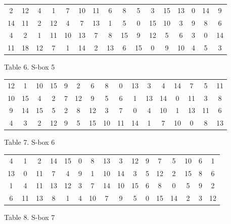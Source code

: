 \documentclass[11pt]{article}
\begin{document}
\begin{center}
\begin{tabular}{ | c | c | c | c | c | c | c | c | c | c | c | c | c | c | c | c |}
  \hline
    2&	12& 4& 1& 7& 10& 11& 6& 8& 5& 3& 15& 13& 0& 14& 9\\
    14&	11& 2& 12& 4& 7& 13& 1&	5& 0& 15& 10& 3& 9&	8& 6\\
    4&	2& 1& 11& 10& 13& 7& 8& 15& 9& 12& 5& 6& 3& 0& 14\\
    11&	18& 12& 7& 1& 14& 2& 13& 6& 15& 0& 9& 10& 4& 5& 3\\
  \hline
\end{tabular}
\end{center}
\begin{center}
Table 6. S-box 5
\end{center}

\begin{center}
\begin{tabular}{ | c | c | c | c | c | c | c | c | c | c | c | c | c | c | c | c |}
  \hline
    12&	1& 10& 15& 9& 2& 6&	8& 0& 13& 3& 4& 14&	7& 5& 11\\
    10&	15& 4& 2& 7& 12& 9& 5&	6& 1& 13& 14& 0& 11& 3& 8\\
    9&	14& 15& 5& 2& 8& 12& 3& 7& 0& 4& 10& 1& 13& 11& 6\\
    4&	3& 2& 12& 9& 5& 15& 10&	11& 14& 1& 7& 10& 0& 8& 13\\
  \hline
\end{tabular}
\end{center}
\begin{center}
Table 7. S-box 6
\end{center}

\begin{center}
\begin{tabular}{ | c | c | c | c | c | c | c | c | c | c | c | c | c | c | c | c |}
  \hline
    4&	1& 2& 14& 15& 0& 8&	13& 3& 12& 9& 7& 5&	10& 6& 1\\
    13&	0& 11& 7& 4& 9& 1& 10& 14& 3& 5& 12& 2& 15&	8& 6\\
    1&	4& 11& 13& 12& 3& 7& 14& 10& 15& 6& 8& 0& 5& 9& 2\\
    6&	11& 13& 8& 1& 4& 10& 7&	9& 5& 0& 15& 14& 2&	3& 12\\
  \hline
\end{tabular}
\end{center}
\begin{center}
Table 8. S-box 7
\end{center}
\end{document}
